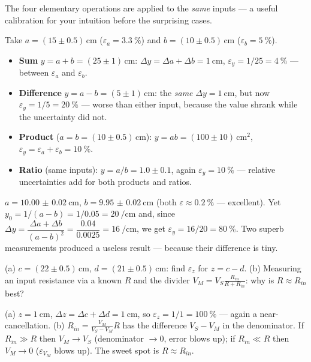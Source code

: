 \documentclass[11pt,a4paper,oneside]{book}
\begin{document}
The four elementary operations are applied to the \emph{same} inputs --- a
useful calibration for your intuition before the surprising cases.

\begin{wexample}
Take $a=(15\pm0.5)\,\unit{\centi\meter}$ ($\varepsilon_a=\qty{3.3}{\percent}$) and
$b=(10\pm0.5)\,\unit{\centi\meter}$ ($\varepsilon_b=\qty{5}{\percent}$).
\begin{itemize}[leftmargin=1.2cm,itemsep=1pt]
  \item \textbf{Sum} $y=a+b=(25\pm1)\,\unit{\centi\meter}$:
        $\Delta y=\Delta a+\Delta b=\qty{1}{\centi\meter}$,
        $\varepsilon_y=1/25=\qty{4}{\percent}$ --- between $\varepsilon_a$ and
        $\varepsilon_b$.
  \item \textbf{Difference} $y=a-b=(5\pm1)\,\unit{\centi\meter}$: the
        \emph{same} $\Delta y=\qty{1}{\centi\meter}$, but now
        $\varepsilon_y=1/5=\qty{20}{\percent}$ --- worse than either input,
        because the value shrank while the uncertainty did not.
  \item \textbf{Product} ($a=b=(10\pm0.5)\,\unit{\centi\meter}$):
        $y=ab=(100\pm10)\,\unit{\centi\meter\squared}$,
        $\varepsilon_y=\varepsilon_a+\varepsilon_b=\qty{10}{\percent}$.
  \item \textbf{Ratio} (same inputs): $y=a/b=1.0\pm0.1$,
        again $\varepsilon_y=\qty{10}{\percent}$ --- relative uncertainties add
        for both products and ratios.
\end{itemize}
\end{wexample}

\begin{wexample}[Catastrophic cancellation, $y=1/(a-b)$]
$a=\qty{10.00(2)}{\centi\meter}$, $b=\qty{9.95(2)}{\centi\meter}$ (both
$\varepsilon\approx\qty{0.2}{\percent}$ --- excellent). Yet
$y_0=1/(a-b)=1/0.05=\qty{20}{\per\centi\meter}$ and, since
$\Delta y=\dfrac{\Delta a+\Delta b}{(a-b)^2}=\dfrac{0.04}{0.0025}
=\qty{16}{\per\centi\meter}$, we get $\varepsilon_y=16/20=\qty{80}{\percent}$.
Two superb measurements produced a useless result --- because their difference is
tiny.
\end{wexample}

\begin{exercise}
(a) $c=(22\pm0.5)\,\unit{\centi\meter}$, $d=(21\pm0.5)\,\unit{\centi\meter}$: find
$\varepsilon_z$ for $z=c-d$. (b) Measuring an input resistance via a known $R$ and
the divider $V_M=V_S\frac{R_{in}}{R+R_{in}}$: why is $R\approx R_{in}$ best?
\end{exercise}
\begin{solution}
(a) $z=\qty{1}{\centi\meter}$, $\Delta z=\Delta c+\Delta d=\qty{1}{\centi\meter}$,
so $\varepsilon_z=1/1=\qty{100}{\percent}$ --- again a near-cancellation.
(b) $R_{in}=\frac{V_M}{V_S-V_M}R$ has the difference $V_S-V_M$ in the denominator.
If $R_{in}\gg R$ then $V_M\to V_S$ (denominator $\to0$, error blows up); if
$R_{in}\ll R$ then $V_M\to0$ ($\varepsilon_{V_M}$ blows up). The sweet spot is
$R\approx R_{in}$.
\end{solution}
\end{document}

